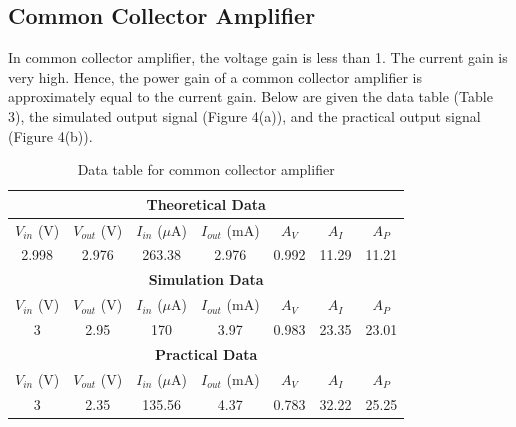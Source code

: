 \documentclass[12pt]{article}
\begin{document}
\subsection{Common Collector Amplifier}
In common collector amplifier, the voltage gain is less than 1. The current gain is very high. Hence, the power gain of a common collector amplifier is approximately equal to the current gain. Below are given the data table (Table 3), the simulated output signal (Figure 4(a)), and the practical output signal (Figure 4(b)).

\bgroup
\def\arraystretch{1.5}
\begin{table}[h!]
    \centering
    \caption{Data table for common collector amplifier}
    \label{tab:CC table}
    \begin{tabular}{|c|c|c|c|c|c|c|}
        \hline
        \multicolumn{7}{|c|}{\textbf{Theoretical Data}} \\
        \hline
        $V_{in}$ (V) & $V_{out}$ (V) & $I_{in}$ ($\mu$A) & $I_{out}$ (mA) & $A_V$ & $A_I$ & $A_P$ \\ \hline
        2.998 & 2.976 & 263.38 & 2.976 & 0.992 & 11.29 & 11.21 \\ \hline\hline
        \multicolumn{7}{|c|}{\textbf{Simulation Data}} \\
        \hline
        $V_{in}$ (V) & $V_{out}$ (V) & $I_{in}$ ($\mu$A) & $I_{out}$ (mA) & $A_V$ & $A_I$ & $A_P$ \\ \hline
        3 & 2.95 & 170 & 3.97 & 0.983 & 23.35 & 23.01 \\ \hline\hline
        \multicolumn{7}{|c|}{\textbf{Practical Data}} \\
        \hline
        $V_{in}$ (V) & $V_{out}$ (V) & $I_{in}$ ($\mu$A) & $I_{out}$ (mA) & $A_V$ & $A_I$ & $A_P$ \\ \hline
        3 & 2.35 & 135.56 & 4.37 & 0.783 & 32.22 & 25.25 \\ \hline
    \end{tabular}
\end{table}
\egroup
\end{document}
